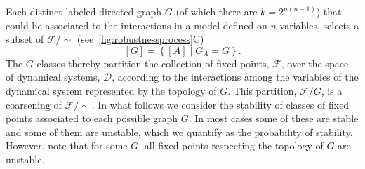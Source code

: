 Each distinct labeled directed graph $G$ (of which there are $k=2^{n(n-1)}$) that could be associated to the interactions in a model defined on $n$ variables, selects a subset of $\mathcal{F} / {\sim}$ (see~\ref{fig:robustnessprocess}C)
\begin{equation}\label{eq:jacgrapheqs}
[G] = \left\{ [A] \; | \; G_A = G \right\}.
\end{equation}
The $G$-classes thereby partition the collection of fixed points, $\mathcal{F}$, over the space of dynamical systems, $\mathcal{D}$, according to the interactions among the variables of the dynamical system represented by the topology of $G$. This partition, $\mathcal{F} / G$, is a coarsening of $\mathcal{F} / {\sim}$. In what follows we consider the stability of classes of fixed points associated to each possible graph $G$. In most cases some of these are stable and some of them are unstable, which we quantify as the probability of stability. However, note that for some $G$, all fixed points respecting the topology of $G$ are unstable.

